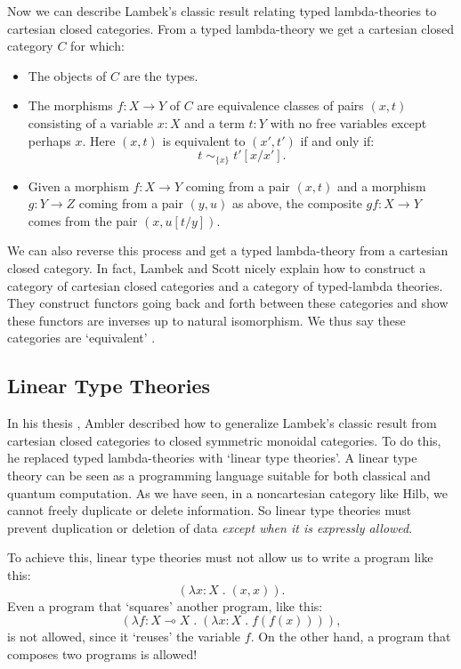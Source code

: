 \documentclass[12pt,twoside,openright]{report}
\newcommand{\Hilb}{\mathrm{Hilb}}
\newcommand{\maps}{\colon}
\newcommand{\lhom}{\multimap}
\begin{document}
Now we can describe Lambek's classic result relating typed lambda-theories to cartesian closed categories.  From a typed lambda-theory we get a cartesian closed category $C$ for which:
\begin{itemize}
\item The objects of $C$ are the types.
\item The morphisms $f \maps X \to Y$ of $C$
are equivalence classes of pairs
$(x,t)$ consisting of a variable $x\!:\!X$ and a term $t\!:\!Y$ with no free variables except perhaps $x$.  Here $(x,t)$ is equivalent to $(x',t')$ if and only if:
\[     t \; \sim_{\{x\}} \; t'[x/x'] . \]
\item Given a morphism $f \maps X \to Y$
coming from a pair $(x,t)$ and a morphism $g \maps Y \to Z$
coming from a pair $(y,u)$ as above, the composite 
$gf \maps X \to Y$ comes from the pair $(x,u[t/y])$.
\end{itemize}
We can also reverse this process and get a typed lambda-theory from a cartesian closed category.  In fact, Lambek and Scott nicely explain how to construct a category of cartesian closed categories and a category of typed-lambda theories.  They construct functors going back and forth between these categories and show these functors are inverses up to natural isomorphism.  We thus say these categories are `equivalent' \cite{LS}.

\subsection{Linear Type Theories}
\label{linear_type_theories}

In his thesis \cite{Ambler}, Ambler described how to generalize Lambek's classic result from cartesian closed categories to closed symmetric monoidal categories.  To do this, he replaced typed lambda-theories with `linear type theories'.  A linear type theory can be seen as a programming language suitable for both classical and quantum computation.  As we have seen, in a noncartesian category like
$\Hilb$, we cannot freely duplicate or delete information.  So linear type theories must prevent duplication or deletion of data {\it except when it is expressly allowed}.

To achieve this, linear type theories must not allow us to write a program like this:
\[    (\lambda x\!:\!X \; . \; (x,x)) .      \]
Even a program that `squares' another program, like this:
\[   
 (\lambda f\!:\!X \lhom X \;.\;(\lambda \!x:\!X \; . \; f(f(x)))), \]
is not allowed, since it `reuses' the variable $f$.  On the other hand, a program that composes two programs is allowed!
\end{document}
